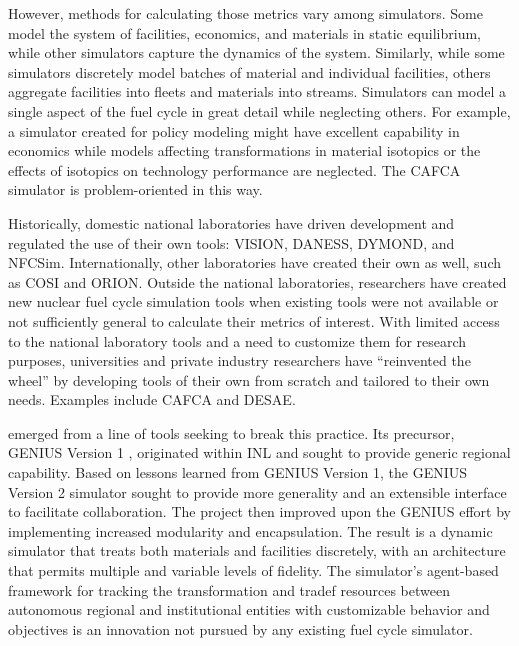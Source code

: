 However, methods for calculating those metrics vary among simulators. Some
model the system of facilities, economics, and materials in static equilibrium,
while other simulators capture the dynamics of the system.  Similarly, while
some simulators discretely model batches of material and individual facilities,
others aggregate facilities into fleets and materials into streams. Simulators
can model a single aspect of the fuel cycle in great detail while neglecting
others. For example, a simulator created for policy modeling might have
excellent capability in economics while models affecting transformations in
material isotopics or the effects of isotopics on technology performance are
neglected.  The \gls{CAFCA}\cite{guerin_impact_2009} simulator is problem-oriented
in this way.

Historically, domestic national laboratories have driven development and regulated
the use of their own tools: \gls{VISION}\cite{jacobson_verifiable_2010},
\gls{DANESS}\cite{van_den_durpel_daness_2009},
\gls{DYMOND}\cite{yacout_modeling_2005}, and
\gls{NFCSim}\cite{schneider_nfcsim:_2005,allan_guidance_2008}.
Internationally, other laboratories have created their own as well, such as
\gls{COSI}\cite{boucher_cosi_2005,boucher_cosi:_2006,meyer_new_2009,coquelet-pascal_comparison_2011}
and
\gls{ORION}\cite{worrall_scenario_2007}.
Outside the national laboratories,
researchers have created new nuclear fuel cycle simulation tools when existing
tools were not available or not sufficiently general to calculate their metrics
of interest.  With limited access to the national
laboratory tools and a need to customize them for research purposes,
universities and private industry researchers have ``reinvented the wheel'' by
developing tools of their own from scratch and tailored to their own needs.
Examples include \gls{CAFCA}\cite{guerin_benchmark_2009} and
\gls{DESAE}\cite{andrianova_desae_2008,mccarthy_benchmark_2012,allan_guidance_2008}.

\Cyclus emerged from a line of tools seeking to break this practice.  Its
precursor,
\gls{GENIUS} Version 1 \cite{dunzik-gougar_global_2007,jain_transitioning_2006},
originated within \gls{INL} and sought to provide generic regional capability.
Based on lessons learned from \gls{GENIUS} Version 1, the \gls{GENIUS} Version
2 \cite{oliver_studying_2009,huff_geniusv2_2009} simulator sought to provide more
generality and an extensible interface to facilitate collaboration.  The
\Cyclus project then improved upon the \gls{GENIUS} effort by
implementing increased modularity and encapsulation.  The result is a dynamic
simulator that treats both materials and facilities discretely, with an
architecture that permits multiple and variable levels of fidelity. The
simulator's agent-based framework for tracking the transformation and tradef
resources between autonomous regional and institutional entities with
customizable behavior and objectives is an innovation not pursued by any
existing fuel cycle simulator.

